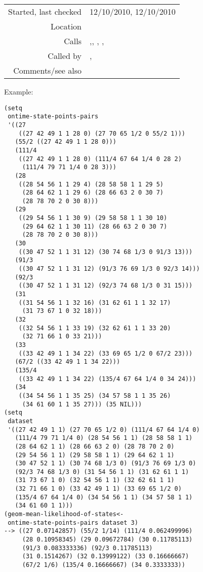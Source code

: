 \vspace{0.3cm}
\begin{tabular}{r|p{8cm}}
Started, last checked & 12/10/2010, 12/10/2010 \\
Location & \nameref{sec:generating-beat-MNN-spacing-backwards} \\
Calls & \nameref{fun:geom-mean-likelihood-of-subset<-},\newline \nameref{fun:max-item}, \nameref{fun:min-item}, \nameref{fun:nth-list-of-lists},\newline \nameref{fun:orthogonal-projection-not-unique-equalp} \\
Called by & \nameref{fun:generate-beat-MNN-spacing<-},\newline \nameref{fun:generate-beat-spacing-forcing<-} \\
Comments/see also & 
\end{tabular}

\vspace{0.5cm}
\noindent Example:
\begin{verbatim}
(setq
 ontime-state-points-pairs
 '((27
    ((27 42 49 1 1 28 0) (27 70 65 1/2 0 55/2 1)))
   (55/2 ((27 42 49 1 1 28 0)))
   (111/4
    ((27 42 49 1 1 28 0) (111/4 67 64 1/4 0 28 2)
     (111/4 79 71 1/4 0 28 3)))
   (28
    ((28 54 56 1 1 29 4) (28 58 58 1 1 29 5)
     (28 64 62 1 1 29 6) (28 66 63 2 0 30 7)
     (28 78 70 2 0 30 8)))
   (29
    ((29 54 56 1 1 30 9) (29 58 58 1 1 30 10)
     (29 64 62 1 1 30 11) (28 66 63 2 0 30 7)
     (28 78 70 2 0 30 8)))
   (30
    ((30 47 52 1 1 31 12) (30 74 68 1/3 0 91/3 13)))
   (91/3
    ((30 47 52 1 1 31 12) (91/3 76 69 1/3 0 92/3 14)))
   (92/3
    ((30 47 52 1 1 31 12) (92/3 74 68 1/3 0 31 15)))
   (31
    ((31 54 56 1 1 32 16) (31 62 61 1 1 32 17)
     (31 73 67 1 0 32 18)))
   (32
    ((32 54 56 1 1 33 19) (32 62 61 1 1 33 20)
     (32 71 66 1 0 33 21)))
   (33
    ((33 42 49 1 1 34 22) (33 69 65 1/2 0 67/2 23)))
   (67/2 ((33 42 49 1 1 34 22)))
   (135/4
    ((33 42 49 1 1 34 22) (135/4 67 64 1/4 0 34 24)))
   (34
    ((34 54 56 1 1 35 25) (34 57 58 1 1 35 26)
     (34 61 60 1 1 35 27))) (35 NIL)))
(setq
 dataset
 '((27 42 49 1 1) (27 70 65 1/2 0) (111/4 67 64 1/4 0)
   (111/4 79 71 1/4 0) (28 54 56 1 1) (28 58 58 1 1)
   (28 64 62 1 1) (28 66 63 2 0) (28 78 70 2 0)
   (29 54 56 1 1) (29 58 58 1 1) (29 64 62 1 1)
   (30 47 52 1 1) (30 74 68 1/3 0) (91/3 76 69 1/3 0)
   (92/3 74 68 1/3 0) (31 54 56 1 1) (31 62 61 1 1)
   (31 73 67 1 0) (32 54 56 1 1) (32 62 61 1 1)
   (32 71 66 1 0) (33 42 49 1 1) (33 69 65 1/2 0)
   (135/4 67 64 1/4 0) (34 54 56 1 1) (34 57 58 1 1)
   (34 61 60 1 1)))
(geom-mean-likelihood-of-states<-
 ontime-state-points-pairs dataset 3)
--> ((27 0.07142857) (55/2 1/14) (111/4 0.062499996)
     (28 0.10958345) (29 0.09672784) (30 0.11785113)
     (91/3 0.083333336) (92/3 0.11785113)
     (31 0.1514267) (32 0.13999122) (33 0.16666667)
     (67/2 1/6) (135/4 0.16666667) (34 0.3333333))
\end{verbatim}

